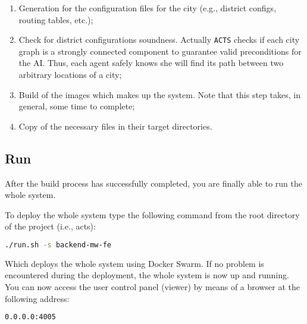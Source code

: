 \begin{enumerate}
\item Generation for the configuration files for the city (e.g., district
  configs, routing tables, etc.);
\item Check for district configurations soundness. Actually \texttt{ACTS}
  checks if each city graph is a strongly connected component to guarantee
  valid preconditions for the AI. Thus, each agent safely knows she will
  find its path between two arbitrary locations of a city;
\item Build of the images which makes up the system. Note that this step
  takes, in general, some time to complete;
\item Copy of the necessary files in their target directories.
\end{enumerate}

\subsection{Run}\label{sec:sys-run}

After the build process has successfully completed, you are finally able to
run the whole system.

To deploy the whole system type the following command from the root directory
of the project (i.e., acts):

\begin{lstlisting}[language=bash]
./run.sh -s backend-mw-fe
\end{lstlisting}

Which deploys the whole system using Docker Swarm.
If no problem is encountered during the deployment, the whole system is now up
and running.
You can now access the user control panel (viewer) by means of a browser at the
following address:

\begin{lstlisting}[language=bash]
0.0.0.0:4005
\end{lstlisting}
